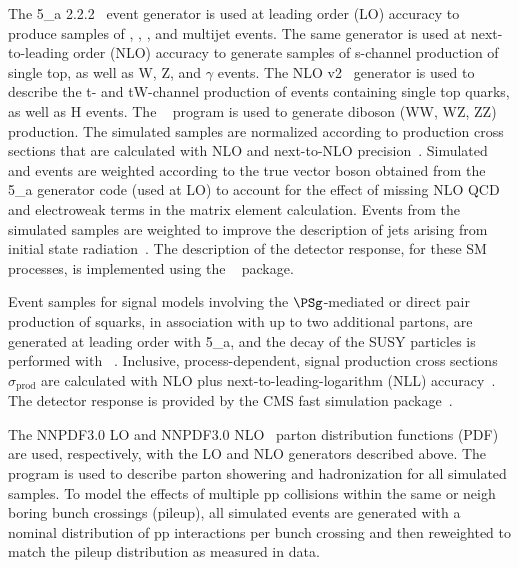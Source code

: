 The {\MADGRAPH{}5\_a\MCATNLO} 2.2.2~\cite{Alwall2014} event generator
is used at leading order (LO) accuracy to produce samples of \wj, \zj,
\ttbar, and multijet events. The same generator is used at
next-to-leading order (NLO) accuracy to generate samples of s-channel
production of single top, as well as {\ttbar}W, {\ttbar}Z, and
{\ttbar}$\gamma$ events. The NLO \POWHEG v2~\cite{powheg,
  powheg_top_Wt} generator is used to describe the t- and tW-channel
production of events containing single top quarks, as well as
{\ttbar}H events. The ~\cite{pythia} program is used to
generate diboson (WW, WZ, ZZ) production. The simulated samples are
normalized according to production cross sections that are calculated
with NLO and next-to-NLO precision~\cite{Alwall2014, wphys, fewz,
  wwxs, top++, nlotop, powheg_top_Wt}. Simulated \wj and \zj events
are weighted according to the true vector boson \pt obtained from the
{\MADGRAPH{}5\_a\MCATNLO} generator code (used at LO) to account for
the effect of missing NLO QCD and electroweak terms in the matrix
element calculation. Events from the \ttbar simulated samples are
weighted to improve the description of jets arising from initial state
radiation~\cite{single-lepton-stop}. The description of the detector
response, for these SM processes, is implemented using the
\GEANTfour~\cite{geant} package.

Event samples for signal models involving the $\PSg$-mediated or
direct pair production of squarks, in association with up to two
additional partons, are generated at leading order with
{\MADGRAPH{}5\_a\MCATNLO}, and the decay of the SUSY particles is
performed with ~\cite{pythia}. Inclusive,
process-dependent, signal production cross sections
$\sigma_\text{prod}$ are calculated with NLO plus
next-to-leading-logarithm (NLL) accuracy~\cite{Beenakker:1996ch,
  PhysRevLett.102.111802, PhysRevD.80.095004, 1126-6708-2009-12-041,
  doi:10.1142/S0217751X11053560, susynlo}. The detector response is
provided by the CMS fast simulation package~\cite{fastsim}.

The \textsc{NNPDF}3.0 LO and \textsc{NNPDF}3.0 NLO~\cite{nnpdf} parton
distribution functions (PDF) are used, respectively, with the LO and
NLO generators described above. The ~\cite{pythia} program
is used to describe parton showering and hadronization for all
simulated samples. To model the effects of multiple pp collisions
within the same or neigh boring bunch crossings (pileup), all simulated
events are generated with a nominal distribution of pp interactions
per bunch crossing and then reweighted to match the pileup
distribution as measured in data.

